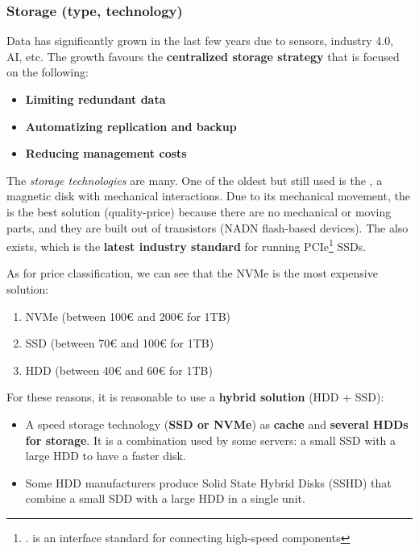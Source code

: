 \newpage

\subsubsection{Storage (type, technology)}\label{subsubsection: Storage (type, technology)}

Data has significantly grown in the last few years due to sensors, industry 4.0, AI, etc. The growth favours the \textbf{centralized storage strategy} that is focused on the following:
\begin{itemize}
    \item \textbf{Limiting redundant data}
    \item \textbf{Automatizing replication and backup}
    \item \textbf{Reducing management costs}
\end{itemize}

\highspace
The \emph{storage technologies} are many. One of the oldest but still used is the , a magnetic disk with mechanical interactions. Due to its mechanical movement, the  is the best solution (quality-price) because there are no mechanical or moving parts, and they are built out of transistors (NADN flash-based devices). The  also exists, which is the \textbf{latest industry standard} for running PCIe\footnote{. is an interface standard for connecting high-speed components} SSDs.

\highspace
As for price classification, we can see that the NVMe is the most expensive solution:
\begin{enumerate}
    \item NVMe (between 100€ and 200€ for 1TB)
    \item SSD (between 70€ and 100€ for 1TB)
    \item HDD (between 40€ and 60€ for 1TB)
\end{enumerate}
For these reasons, it is reasonable to use a \textbf{hybrid solution} (HDD + SSD):
\begin{itemize}
    \item A speed storage technology (\textbf{SSD or NVMe}) as \textbf{cache} and \textbf{several HDDs for storage}. It is a combination used by some servers: a small SSD with a large HDD to have a faster disk.
    
    \item Some HDD manufacturers produce Solid State Hybrid Disks (SSHD) that combine a small SDD with a large HDD in a single unit.
\end{itemize}

